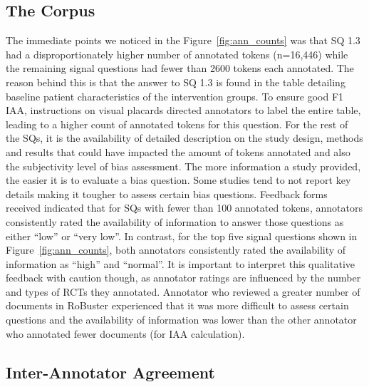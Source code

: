 \documentclass[sn-mathphys,Numbered]{sn-jnl}%
\theoremstyle{thmstyleone}%
\theoremstyle{thmstyletwo}%
\theoremstyle{thmstylethree}%
\begin{document}
\subsection{The Corpus}
\label{disc:corpus}
%
The immediate points we noticed in the Figure~\ref{fig:ann_counts} was that SQ 1.3 had a disproportionately higher number of annotated tokens (n=16,446) while the remaining signal questions had fewer than 2600 tokens each annotated.
The reason behind this is that the answer to SQ 1.3 is found in the table detailing baseline patient characteristics of the intervention groups.
To ensure good F1 IAA, instructions on visual placards directed annotators to label the entire table, leading to a higher count of annotated tokens for this question.
For the rest of the SQs, it is the availability of detailed description on the study design, methods and results that could have impacted the amount of tokens annotated and also the subjectivity level of bias assessment.
The more information a study provided, the easier it is to evaluate a bias question.
Some studies tend to not report key details making it tougher to assess certain bias questions.
Feedback forms received indicated that for SQs with fewer than 100 annotated tokens, annotators consistently rated the availability of information to answer those questions as either ``low'' or ``very low''.
In contrast, for the top five signal questions shown in Figure~\ref{fig:ann_counts}, both annotators consistently rated the availability of information as ``high'' and ``normal''.
It is important to interpret this qualitative feedback with caution though, as annotator ratings are influenced by the number and types of RCTs they annotated.
Annotator who reviewed a greater number of documents in RoBuster experienced that it was more difficult to assess certain questions and the availability of information was lower than the other annotator who annotated fewer documents (for IAA calculation).
%
%
%
\subsection{Inter-Annotator Agreement}
\label{disc:iaa}
%
\end{document}
